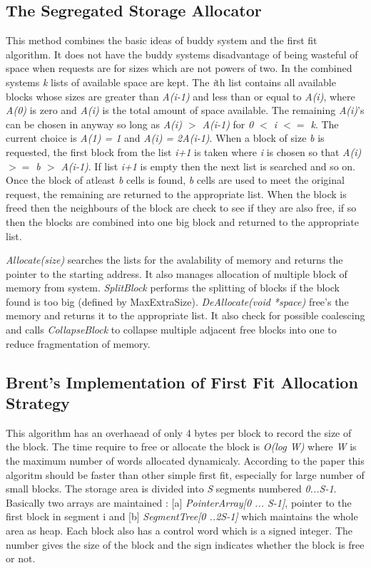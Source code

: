 \documentclass[11pt]{report}
\begin{document}
\subsection{The Segregated Storage Allocator}

This method combines the basic ideas of buddy system and the first fit
algorithm. It does not have the buddy systems disadvantage of being
wasteful of space when requests are for sizes which are not powers of
two. In the combined systems {\it k} lists of available space are kept.
The {\it i}th list contains all available blocks whose sizes are greater
than {\it A(i-1)} and less than or equal to {\it A(i)}, where {\it A(0)}
is zero and {\it A(i)} is the total amount of space available. The
remaining {\it A(i)}'s can be chosen in anyway so long as {\it A(i) $>$
A(i-1)} for {\it 0 $<$ i $<=$ k}. The current choice is {\it A(1) = 1} and
{\it A(i) = 2A(i-1)}. When a block of size {\it b} is requested, the first
block from the list {\it i+1} is taken where {\it i} is chosen so that
{\it A(i) $>=$ b $>$ A(i-1)}. If list {\it i+1} is empty then the next
list is searched and so on. Once the block of atleast {\it b} cells is
found, {\it b} cells are used to meet the original request, the remaining
are returned to the appropriate list. When the block is freed then the
neighbours of the block are check to see if they are also free, if so then
the blocks are combined into one big block and returned to the appropriate
list.

{\it Allocate(size)} searches the lists for the avalability of memory
and returns the pointer to the starting address. It also manages
allocation of multiple block of memory from system. {\it SplitBlock}
performs the splitting of blocks if the block found is too big (defined
by MaxExtraSize). {\it DeAllocate(void *space)} free's the memory and
returns it to the appropriate list. It also check for possible
coalescing and calls {\it CollapseBlock} to collapse multiple adjacent
free blocks into one to reduce fragmentation of memory. 

\subsection{Brent's Implementation of First Fit Allocation Strategy}

This algorithm has an overhaead of only 4 bytes per block to record the
size of the block. The time require to free or allocate the block is
{\it O(log W)} where {\it W} is the maximum number of words allocated
dynamicaly. According to the paper this algoritm should be faster than
other simple first fit, especially for large number of small blocks. The
storage area is divided into {\it S} segments numbered
{\it 0...S-1}. Basically two arrays are maintained : [a] {\it PointerArray[0
... S-1]}, pointer to the first block in segment i and [b]{\it
SegmentTree[0 ..2S-1]} which maintains the whole area as heap. Each block
also has a control word which is a signed integer. The number gives the
size of the block and the sign indicates whether the block is free or not.
 
\end{document}
